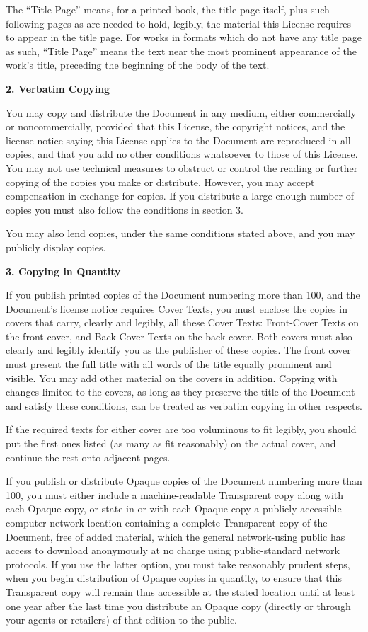 \documentclass{doc}
\begin{document}
The ``Title Page'' means, for a printed book, the title page itself,
plus such following pages as are needed to hold, legibly, the material
this License requires to appear in the title page.  For works in
formats which do not have any title page as such, ``Title Page'' means
the text near the most prominent appearance of the work's title,
preceding the beginning of the body of the text.


\noindent\textbf{2. Verbatim Copying}

You may copy and distribute the Document in any medium, either
commercially or noncommercially, provided that this License, the
copyright notices, and the license notice saying this License applies
to the Document are reproduced in all copies, and that you add no other
conditions whatsoever to those of this License.  You may not use
technical measures to obstruct or control the reading or further
copying of the copies you make or distribute.  However, you may accept
compensation in exchange for copies.  If you distribute a large enough
number of copies you must also follow the conditions in section 3.

You may also lend copies, under the same conditions stated above, and
you may publicly display copies.


\noindent\textbf{3. Copying in Quantity}

If you publish printed copies of the Document numbering more than 100,
and the Document's license notice requires Cover Texts, you must enclose
the copies in covers that carry, clearly and legibly, all these Cover
Texts: Front-Cover Texts on the front cover, and Back-Cover Texts on
the back cover.  Both covers must also clearly and legibly identify
you as the publisher of these copies.  The front cover must present
the full title with all words of the title equally prominent and
visible.  You may add other material on the covers in addition.
Copying with changes limited to the covers, as long as they preserve
the title of the Document and satisfy these conditions, can be treated
as verbatim copying in other respects.

If the required texts for either cover are too voluminous to fit
legibly, you should put the first ones listed (as many as fit
reasonably) on the actual cover, and continue the rest onto adjacent
pages.

If you publish or distribute Opaque copies of the Document numbering
more than 100, you must either include a machine-readable Transparent
copy along with each Opaque copy, or state in or with each Opaque copy
a publicly-accessible computer-network location containing a complete
Transparent copy of the Document, free of added material, which the
general network-using public has access to download anonymously at no
charge using public-standard network protocols.  If you use the latter
option, you must take reasonably prudent steps, when you begin
distribution of Opaque copies in quantity, to ensure that this
Transparent copy will remain thus accessible at the stated location
until at least one year after the last time you distribute an Opaque
copy (directly or through your agents or retailers) of that edition to
the public.
\end{document}
